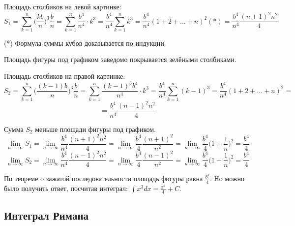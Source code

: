 	\begin{explanation}
	Площадь столбиков на левой картинке:
	\[ S_1 = \sum_{k = 1}^n \bigg(\frac{kb}{n}\bigg)^3 \frac{b}{n} = \sum_{k = 1}^n \frac{b^4}{n^4} \cdot k^3 = \frac{b^4}{n^4} \sum_{k = 1}^n k^3 = \frac{b^4}{n^4} (1 + 2 + ... + n)^2 (*) = \frac{b^4}{n^4} \frac{(n + 1)^2n^2}{4} \]
	
	(*) Формула суммы кубов доказывается по индукции.
	
	Площадь фигуры под графиком заведомо покрывается зелёными столбиками.
	
	Площадь столбиков на правой картинке:
	\[ S_2 = \sum_{k = 1}^n \bigg(\frac{(k - 1)b}{n}\bigg)^3 \frac{b}{n} = \sum_{k = 1}^n \frac{(k - 1)^3b^4}{n^4} \cdot k^3 = \frac{b^4}{n^4} \sum_{k = 1}^n (k - 1)^3 = \frac{b^4}{n^4} (1 + 2 + ... + n)^2 = \]
	\[ = \frac{b^4}{n^4} \frac{(n - 1)^2n^2}{4} \]
	
	Сумма $S_2$ меньше площади фигуры под графиком.
	\[ \lim_{n \to \infty} S_1 = \lim_{n \to \infty} \frac{b^4}{n^4} \frac{(n + 1)^2n^2}{4} = \lim_{n \to \infty} \frac{b^4}{4} \frac{(n + 1)^2}{n^2} = \lim_{n \to \infty} \frac{b^4}{4} \bigg(1 + \frac{1}{n}\bigg)^2 = \frac{b^4}{4} \]
	\[ \lim_{n \to \infty} S_2 = \lim_{n \to \infty} \frac{b^4}{n^4} \frac{(n - 1)^2n^2}{4} = \lim_{n \to \infty} \frac{b^4}{4} \frac{(n - 1)^2}{n^2} = \lim_{n \to \infty} \frac{b^4}{4} \bigg(1 - \frac{1}{n}\bigg)^2 = \frac{b^4}{4} \]
	
	По теореме о зажатой последовательности площадь фигуры равна $\frac{b^4}{4}$. Но можно было получить ответ, посчитав интеграл: $\displaystyle\int x^3 dx = \frac{x^4}{4} + C$.
	\end{explanation}
	
	\subsection{Интеграл Римана}
	

